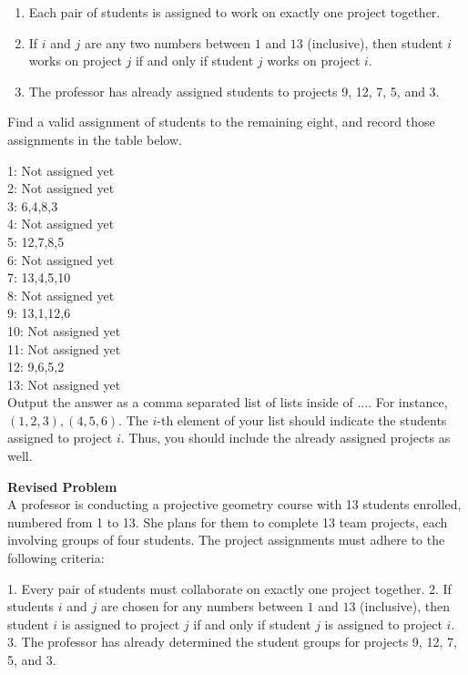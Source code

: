 \begin{enumerate}
    \item Each pair of students is assigned to work on exactly one project together.
    \item If $i$ and $j$ are any two numbers between $1$ and $13$ (inclusive), then student $i$ works on project $j$ if and only if student $j$ works on project $i$.
    \item The professor has already assigned students to projects 9, 12, 7, 5, and 3.
\end{enumerate}

Find a valid assignment of students to the remaining eight, and record those assignments in the table below.

1: Not assigned yet \\
2: Not assigned yet \\
3: 6,4,8,3 \\
4: Not assigned yet \\
5: 12,7,8,5 \\
6: Not assigned yet \\
7: 13,4,5,10 \\
8: Not assigned yet \\
9: 13,1,12,6 \\
10: Not assigned yet \\
11: Not assigned yet \\
12: 9,6,5,2 \\
13: Not assigned yet \\

Output the answer as a comma separated list of lists inside of $\boxed{...}$. For instance, $\boxed{(1,2,3),(4,5,6)}$. The $i$-th element of your list should indicate the students assigned to project $i$. Thus, you should include the already assigned projects as well.

\textbf{Revised Problem}\\
A professor is conducting a projective geometry course with 13 students enrolled, numbered from 1 to 13. She plans for them to complete 13 team projects, each involving groups of four students. The project assignments must adhere to the following criteria:

1. Every pair of students must collaborate on exactly one project together.
2. If students $i$ and $j$ are chosen for any numbers between $1$ and $13$ (inclusive), then student $i$ is assigned to project $j$ if and only if student $j$ is assigned to project $i$.
3. The professor has already determined the student groups for projects 9, 12, 7, 5, and 3.

